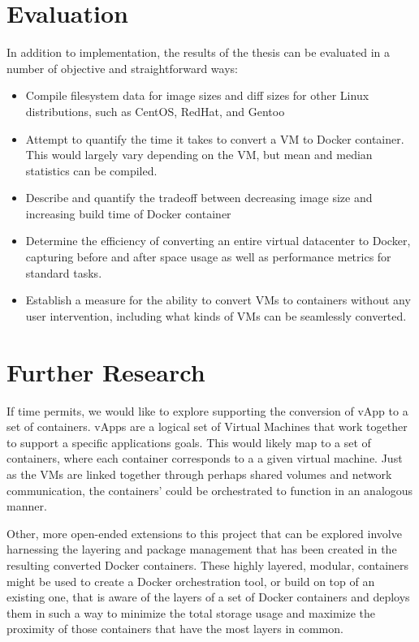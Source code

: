 \documentclass[\myfontsize, letterpaper]{article}
\begin{document}
\section{Evaluation}
\label{sec:evaluation}
In addition to implementation, the results of the thesis can be evaluated in a number of objective and straightforward ways: 
\begin{itemize}
\item Compile filesystem data for image sizes and diff sizes for other Linux distributions, such as CentOS, RedHat, and Gentoo
\item Attempt to quantify the time it takes to convert a VM to Docker container. This would largely vary depending on the VM, but mean and median statistics can be compiled.
\item Describe and quantify the tradeoff between decreasing image size and increasing build time of Docker container
\item Determine the efficiency of converting an entire virtual datacenter to Docker, capturing before and after space usage as well as performance metrics for standard tasks.
\item Establish a measure for the ability to convert VMs to containers without any user intervention, including what kinds of VMs can be seamlessly converted.
\end{itemize}

\section{Further Research}
\label{sec:futureresearch}
If time permits, we would like to explore supporting the conversion of vApp to a set of containers. vApps are a logical set of Virtual Machines that work together to support a specific applications goals. This would likely map to a set of containers, where each container corresponds to a a given virtual machine. Just as the VMs are linked together through perhaps shared volumes and network communication, the containers' could be orchestrated to function in an analogous manner.

Other, more open-ended extensions to this project that can be explored involve harnessing the layering and package management that has been created in the resulting converted Docker containers. These highly layered, modular, containers might be used to create a Docker orchestration tool, or build on top of an existing one, that is aware of the layers of a set of Docker containers and deploys them in such a way to minimize the total storage usage and maximize the proximity of those containers that have the most layers in common.
\end{document}

